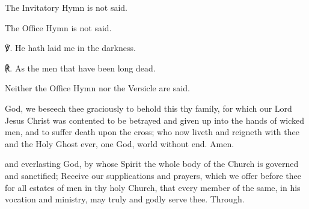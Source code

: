 \clearpage
{}
\fancyhead[RE,LO]{}

\vspace{-0.5\baselineskip}

\mattins

\vspace{-0.5\baselineskip}

\begin{rubric}
	The Invitatory Hymn is not said.
\end{rubric}


\begin{rubric}
	The Office Hymn is not said.
\end{rubric}

℣. He hath laid me in the darkness.

℟. As the men that have been long dead.


\vspace{-1\baselineskip}

\secondEvensong


\begin{rubric}
	Neither the Office Hymn nor the Versicle are said.
\end{rubric}


\vspace{-0.5\baselineskip}

\collect
{} God, we beseech thee graciously to behold this thy family, for which our Lord Jesus Christ was contented to be betrayed and given up into the hands of wicked men, and to suffer death upon the cross; who now liveth and reigneth with thee and the Holy Ghost ever, one God, world without end. Amen.

 and everlasting God, by whose Spirit the whole body of the Church is governed and sanctified; Receive our supplications and prayers, which we offer before thee for all estates of men in thy holy Church, that every member of the same, in his vocation and ministry, may truly and godly serve thee. Through.

